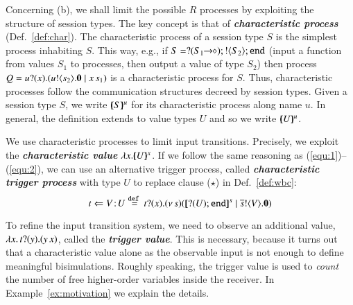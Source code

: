 \smallskip


Concerning (b), we shall limit the possible $R$ processes by
exploiting the structure of session types.
The key concept is that of {\bf \emph{characteristic process}} 
(Def.~\ref{def:char}). 
The characteristic process of 
a session type $S$ is the 
simplest process inhabiting $S$. 
This way, e.g., if $S = ? (S_1\!\! \rightarrow\!\! \diamond) ; ! \langle S_2 \rangle ; \mathtt{end}$
(input a function from values $S_1$ to processes, then output a value of type $S_2$)
then process $Q = u ? (x) . (u ! \langle s_2 \rangle . \mathbf{0} \;|\; x\, {s_1})$
is a characteristic process for $S$.
Thus, characteristic processes follow the communication structures decreed by session types.
Given a session type $S$, we write $[\!\!(S)\!\!]^{u} $ for its characteristic process along name $u$.
In general, 
the definition
extends to  value types $U$ and so we write $[\!\!(U)\!\!]^{u}$.

We use characteristic processes to limit input transitions.
Precisely, we exploit  the
{\bf\em characteristic value} $\lambda x.[\!\!(U)\!\!]^{x}$. %
If we follow the same reasoning as (\ref{equ:1})--(\ref{equ:2}), 
we can use an alternative trigger process, called
{\bf\em characteristic trigger process} with type 
$U$ to replace clause
($\star$) in Def.~\ref{def:wbc}:
\begin{equation}
	\label{eq:4}
	\ftrigger{t}{V}{U} \defeq \fotrigger{t}{x}{s}{\btinp{U} \tinact}{V}
\end{equation}

\noi To refine the input transition system, we need to observe 
an additional value, 
$\lambda {x}.\,t ? (y) . (y\, {{x}})$, 
called the {\bf\em trigger value}. 
This is necessary, because it turns out
that a characteristic value 
alone as the observable input 
is not enough to define meaningful bisimulations.
Roughly speaking, the trigger value is used 
to {\em count} the number of free higher-order variables inside 
the receiver. In Example~\ref{ex:motivation} we explain the details. 

